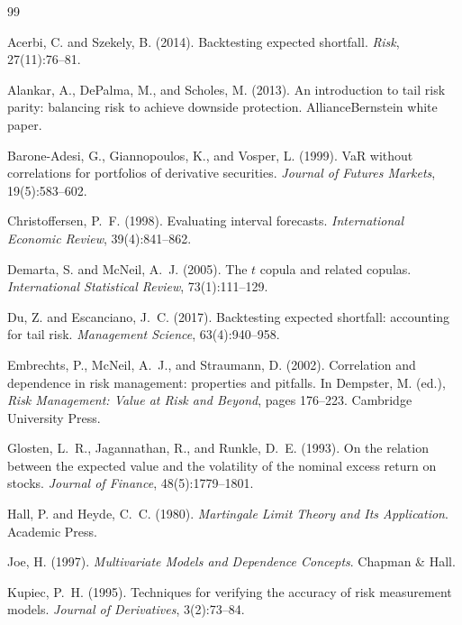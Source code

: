 \documentclass[11pt]{article}
\newcommand{\1}{\mathbf{1}}
\begin{document}

\begin{thebibliography}{99}

Acerbi, C. and Szekely, B. (2014). Backtesting expected shortfall. \emph{Risk}, 27(11):76--81.

Alankar, A., DePalma, M., and Scholes, M. (2013). An introduction to tail risk parity: balancing risk to
achieve downside protection. AllianceBernstein white paper.

Barone-Adesi, G., Giannopoulos, K., and Vosper, L. (1999). VaR without correlations for portfolios of
derivative securities. \emph{Journal of Futures Markets}, 19(5):583--602.

Christoffersen, P.~F. (1998). Evaluating interval forecasts. \emph{International Economic Review},
39(4):841--862.

Demarta, S. and McNeil, A.~J. (2005). The $t$ copula and related copulas. \emph{International Statistical
Review}, 73(1):111--129.

Du, Z. and Escanciano, J.~C. (2017). Backtesting expected shortfall: accounting for tail risk.
\emph{Management Science}, 63(4):940--958.

Embrechts, P., McNeil, A.~J., and Straumann, D. (2002). Correlation and dependence in risk management:
properties and pitfalls. In Dempster, M. (ed.), \emph{Risk Management: Value at Risk and Beyond}, pages
176--223. Cambridge University Press.

Glosten, L.~R., Jagannathan, R., and Runkle, D.~E. (1993). On the relation between the expected value and
the volatility of the nominal excess return on stocks. \emph{Journal of Finance}, 48(5):1779--1801.

Hall, P. and Heyde, C.~C. (1980). \emph{Martingale Limit Theory and Its Application}. Academic Press.

Joe, H. (1997). \emph{Multivariate Models and Dependence Concepts}. Chapman \& Hall.

Kupiec, P.~H. (1995). Techniques for verifying the accuracy of risk measurement models. \emph{Journal of
Derivatives}, 3(2):73--84.


\end{thebibliography}
\end{document}
